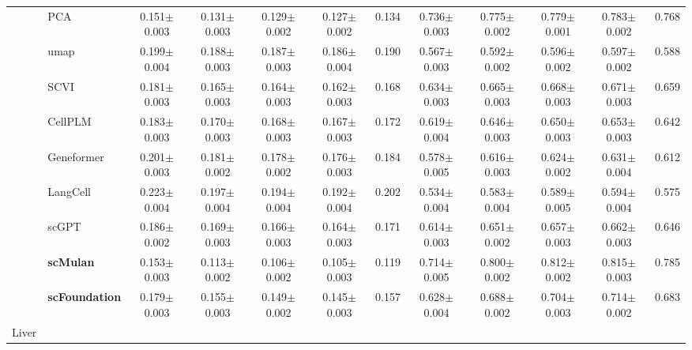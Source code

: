 \begin{table}[htbp]
\begin{tabular}{cl|ccccc|ccccc}
    & PCA      & \cellcolor{gray!25}0.151$\pm$0.003 & 0.131$\pm$0.003 & 0.129$\pm$0.002 & 0.127$\pm$0.002 & 0.134      & \cellcolor{gray!25}0.736$\pm$0.003 & 0.775$\pm$0.002 & 0.779$\pm$0.001 & 0.783$\pm$0.002 & 0.768 \\
    & umap      & 0.199$\pm$0.004 & 0.188$\pm$0.003 & 0.187$\pm$0.003 & 0.186$\pm$0.004 & 0.190      & 0.567$\pm$0.003 & 0.592$\pm$0.002 & 0.596$\pm$0.002 & 0.597$\pm$0.002 & 0.588 \\
    & SCVI      & 0.181$\pm$0.003 & 0.165$\pm$0.003 & 0.164$\pm$0.003 & 0.162$\pm$0.003 & 0.168      & 0.634$\pm$0.003 & 0.665$\pm$0.003 & 0.668$\pm$0.003 & 0.671$\pm$0.003 & 0.659 \\
    & CellPLM      & 0.183$\pm$0.003 & 0.170$\pm$0.003 & 0.168$\pm$0.003 & 0.167$\pm$0.003 & 0.172      & 0.619$\pm$0.004 & 0.646$\pm$0.003 & 0.650$\pm$0.003 & 0.653$\pm$0.003 & 0.642 \\
    & Geneformer      & 0.201$\pm$0.003 & 0.181$\pm$0.002 & 0.178$\pm$0.002 & 0.176$\pm$0.003 & 0.184      & 0.578$\pm$0.005 & 0.616$\pm$0.003 & 0.624$\pm$0.002 & 0.631$\pm$0.004 & 0.612 \\
    & LangCell      & 0.223$\pm$0.004 & 0.197$\pm$0.004 & 0.194$\pm$0.004 & 0.192$\pm$0.004 & 0.202      & 0.534$\pm$0.004 & 0.583$\pm$0.004 & 0.589$\pm$0.005 & 0.594$\pm$0.004 & 0.575 \\
    & scGPT      & 0.186$\pm$0.002 & 0.169$\pm$0.003 & 0.166$\pm$0.003 & 0.164$\pm$0.003 & 0.171      & 0.614$\pm$0.003 & 0.651$\pm$0.002 & 0.657$\pm$0.003 & 0.662$\pm$0.003 & 0.646 \\
    & \cellcolor{gray!25}\textbf{scMulan}      & 0.153$\pm$0.003 & \cellcolor{gray!25}0.113$\pm$0.002 & \cellcolor{gray!25}0.106$\pm$0.002 & \cellcolor{gray!25}0.105$\pm$0.003 & \cellcolor{gray!25}0.119      & 0.714$\pm$0.005 & \cellcolor{gray!25}0.800$\pm$0.002 & \cellcolor{gray!25}0.812$\pm$0.002 & \cellcolor{gray!25}0.815$\pm$0.003 & \cellcolor{gray!25}0.785 \\
    & \cellcolor{gray!25}\textbf{scFoundation}      & 0.179$\pm$0.003 & 0.155$\pm$0.003 & 0.149$\pm$0.002 & 0.145$\pm$0.003 & 0.157      & 0.628$\pm$0.004 & 0.688$\pm$0.002 & 0.704$\pm$0.003 & 0.714$\pm$0.002 & 0.683 \\
    \midrule

    \multirow{9}{*}{Liver}


\end{tabular}
\end{table}
